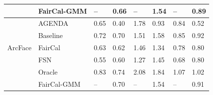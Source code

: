 \begin{table}
\begin{tabular}{l l ll ll ll}
& FairCal-GMM &     -- &  0.66  &     -- &  1.54  &     -- &  0.89  \\
\hline
\multirow{5}{5em}{ArcFace} 
& AGENDA      &    0.65 &  0.40  &    1.78 &  0.93  &    0.84 &  0.52  \\
& Baseline    &    0.72 &  0.70  &    1.51 &  1.58  &    0.85 &  0.92  \\
& FairCal     &    0.63 &  0.62  &    1.46 &  1.34  &    0.78 &  0.80  \\
& FSN         &    0.55 &  0.60  &    1.27 &  1.45  &    0.68 &  0.80  \\
& Oracle      &    0.83 &  0.74  &    2.08 &  1.84  &    1.07 &  1.02  \\
& FairCal-GMM &     -- &  0.70  &     -- &  1.54  &     -- &  0.91  \\
\end{tabular}


\end{table}
